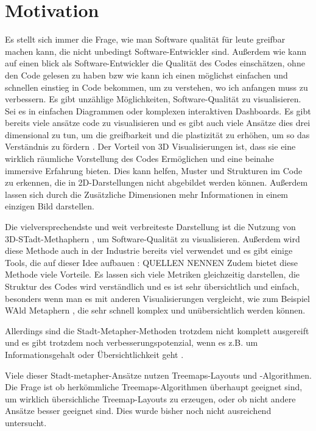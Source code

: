 \section{Motivation} \label{sec:Motivation}
Es stellt sich immer die Frage, wie man Software qualität für leute greifbar machen kann, die nicht unbedingt Software-Entwickler sind. Außerdem wie kann auf einen blick als Software-Entwickler die Qualität des Codes einschätzen, ohne den Code gelesen zu haben bzw wie kann ich einen möglichst einfachen und schnellen einstieg in Code bekommen, um zu verstehen, wo ich anfangen muss zu verbessern.
Es gibt unzählige Möglichkeiten, Software-Qualität zu visualisieren. Sei es in einfachen Diagrammen oder komplexen interaktiven Dashboards. 
Es gibt bereits viele ansätze code zu visualisieren und es gibt auch viele Ansätze dies drei dimensional zu tun, um die greifbarkeit und die plastizität zu erhöhen, um so das Verständnis zu fördern \cite{3dsoftwareMarcus,codeCity1,first_3D_vis,virtualButVisibleMunro}. 
Der Vorteil von 3D Visualisierungen ist, dass sie eine wirklich räumliche Vorstellung des Codes Ermöglichen und eine beinahe immersive Erfahrung bieten. Dies kann helfen, Muster und Strukturen im Code zu erkennen, die in 2D-Darstellungen nicht abgebildet werden können. Außerdem lassen sich durch die Zusätzliche Dimensionen mehr Informationen in einem einzigen Bild darstellen.

Die vielversprechendste und weit verbreiteste Darstellung ist die Nutzung von 3D-STadt-Methaphern \cite{codeCity1}, um Software-Qualität zu visualisieren. Außerdem wird diese Methode auch in der Industrie bereits viel verwendet und es gibt einige Tools, die auf dieser Idee aufbauen : QUELLEN NENNEN
Zudem bietet diese Methode viele Vorteile. Es lassen sich viele Metriken gleichzeitig darstellen, die Struktur des Codes wird verständlich und es ist sehr übersichtlich und einfach, besonders wenn man es mit anderen Visualisierungen vergleicht, wie zum Beispiel WAld Metaphern \cite{softwareForest}, die sehr schnell komplex und unübersichtlich werden können.

Allerdings sind die Stadt-Metapher-Methoden trotzdem nicht komplett ausgereift und es gibt trotzdem noch verbesserungspotenzial, wenn es z.B. um Informationsgehalt oder Übersichtlichkeit geht \cite{lu2008cascaded}. 

Viele dieser Stadt-metapher-Ansätze nutzen Treemaps-Layouts und -Algorithmen. Die Frage ist ob herkömmliche Treemaps-Algorithmen überhaupt geeignet sind, um wirklich übersichliche Treemap-Layouts zu erzeugen, oder ob nicht andere Ansätze besser geeignet sind. Dies wurde bisher noch nicht ausreichend untersucht.